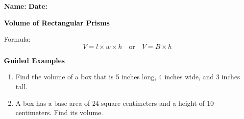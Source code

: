 \documentclass[12pt, letterpaper, fleqn]{article}
\begin{document}
\textbf{Name:} \underline{\hspace{5cm}}
\hfill
\textbf{Date:} \underline{\hspace{3cm}}\\

\begin{tcolorbox}[colback=customteal!20]
    \large\textcolor{black}{\textbf{Volume of Rectangular Prisms}}
\end{tcolorbox}
\vspace{3mm}
Formula:
\[
V = l \times w \times h \quad \text{or} \quad V = B \times h
\]
\newpage
\begin{tcolorbox}[colback=customteal!20]
    \large\textcolor{black}{\textbf{Guided Examples}}
\end{tcolorbox}
\begin{enumerate}[itemsep=3.5cm, leftmargin=0.6cm]
\item Find the volume of a box that is 5 inches long, 4 inches wide, and 3 inches tall.
\vspace{3cm}
\item A box has a base area of 24 square centimeters and a height of 10 centimeters. Find its volume.
\end{enumerate}
\end{document}
